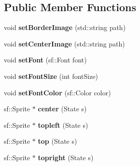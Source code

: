 \subsection*{Public Member Functions}
\begin{DoxyCompactItemize}
\item 
\hypertarget{classgraphics_1_1_basic_style_a58052a91637a277d3621c55a97758b4f}{void {\bfseries set\-Border\-Image} (std\-::string path)}\label{classgraphics_1_1_basic_style_a58052a91637a277d3621c55a97758b4f}

\item 
\hypertarget{classgraphics_1_1_basic_style_a7a981daa0d78bb35a643f88d97af8611}{void {\bfseries set\-Center\-Image} (std\-::string path)}\label{classgraphics_1_1_basic_style_a7a981daa0d78bb35a643f88d97af8611}

\item 
\hypertarget{classgraphics_1_1_basic_style_aedc49863f1d049d66e2c9cf5c0a60e14}{void {\bfseries set\-Font} (sf\-::\-Font font)}\label{classgraphics_1_1_basic_style_aedc49863f1d049d66e2c9cf5c0a60e14}

\item 
\hypertarget{classgraphics_1_1_basic_style_a908a480c26b94453846f22ad18a1243a}{void {\bfseries set\-Font\-Size} (int font\-Size)}\label{classgraphics_1_1_basic_style_a908a480c26b94453846f22ad18a1243a}

\item 
\hypertarget{classgraphics_1_1_basic_style_af2c2afb5ad7d18dcaf90826a06af81b7}{void {\bfseries set\-Font\-Color} (sf\-::\-Color color)}\label{classgraphics_1_1_basic_style_af2c2afb5ad7d18dcaf90826a06af81b7}

\item 
\hypertarget{classgraphics_1_1_basic_style_ad165912d7e28b7837008fa57aa6bed1b}{sf\-::\-Sprite $\ast$ {\bfseries center} (State s)}\label{classgraphics_1_1_basic_style_ad165912d7e28b7837008fa57aa6bed1b}

\item 
\hypertarget{classgraphics_1_1_basic_style_ae95eea3edb7692c7a5986518f39578ab}{sf\-::\-Sprite $\ast$ {\bfseries topleft} (State s)}\label{classgraphics_1_1_basic_style_ae95eea3edb7692c7a5986518f39578ab}

\item 
\hypertarget{classgraphics_1_1_basic_style_ac1bf484a8a1c828c0d97c8f469e70972}{sf\-::\-Sprite $\ast$ {\bfseries top} (State s)}\label{classgraphics_1_1_basic_style_ac1bf484a8a1c828c0d97c8f469e70972}

\item 
\hypertarget{classgraphics_1_1_basic_style_a0f5d3f91470fc7321d9253d029608e0d}{sf\-::\-Sprite $\ast$ {\bfseries topright} (State s)}\label{classgraphics_1_1_basic_style_a0f5d3f91470fc7321d9253d029608e0d}


\end{DoxyCompactItemize}

